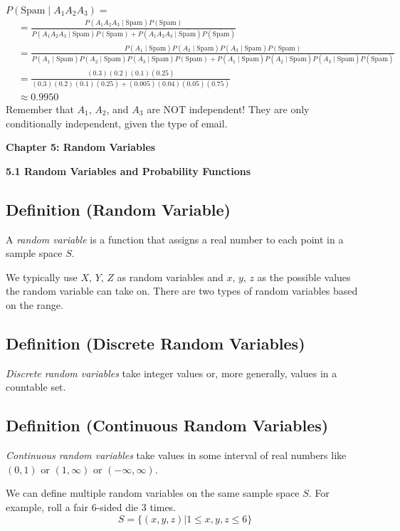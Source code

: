 $ P(\text{Spam}\mid A_1A_2A_3)= $
\begin{align*}
    &=\frac{P(A_1A_2A_3\mid\text{Spam})P(\text{Spam})}
    {P(A_1A_2A_3\mid\text{Spam})P(\text{Spam})+
    P(A_1A_2A_3\mid\overline{\text{Spam}})P(\overline{\text{Spam}})}\\
    &=\frac{P(A_1\mid\text{Spam}) P(A_2\mid\text{Spam}) P(A_3\mid\text{Spam}) P(\text{Spam})}
    {P(A_1\mid\text{Spam}) P(A_2\mid\text{Spam}) P(A_3\mid\text{Spam})P(\text{Spam})+
    P(A_1\mid\overline{\text{Spam}}) P(A_2\mid\overline{\text{Spam}}) P(A_3\mid\overline{\text{Spam}})P(\overline{\text{Spam}})}\\
    &=\frac{(0.3)(0.2)(0.1)(0.25)}{(0.3)(0.2)(0.1)(0.25)+(0.005)(0.04)(0.05)(0.75)} \\
    &\approx 0.9950
\end{align*}
Remember that $ A_1 $, $ A_2 $, and $ A_3 $ are NOT independent!
They are only conditionally independent, given the type of email.

\textbf{\textbf{Chapter 5: Random Variables}}

\textbf{5.1 Random Variables and Probability Functions}
\begin{defbox}
    \subsection{Definition (Random Variable)}
    A \emph{random variable} is a function that assigns a real number to each point in
    a sample space $S$.
\end{defbox}
We typically use $ X,\,Y,\,Z $ as random variables and $ x,\,y,\,z $ as the
possible values the random variable can take on. There are two types
of random variables based on the range.
\begin{defbox}
    \subsection{Definition (Discrete Random Variables)}
    \emph{Discrete random variables} take integer values or, more generally, values in a
    countable set.
\end{defbox}
\begin{defbox}
    \subsection{Definition (Continuous Random Variables)}
    \emph{Continuous random variables} take values in some interval of real numbers
    like $(0,1)$ or $(1,\infty)$ or $ (-\infty,\infty) $.
\end{defbox}
We can define multiple random variables on the same sample space $ S $. For example,
roll a fair $ 6 $-sided die $ 3 $ times.
\[ S=\{(x,y,z)|1\le x, y, z\le 6\} \]

